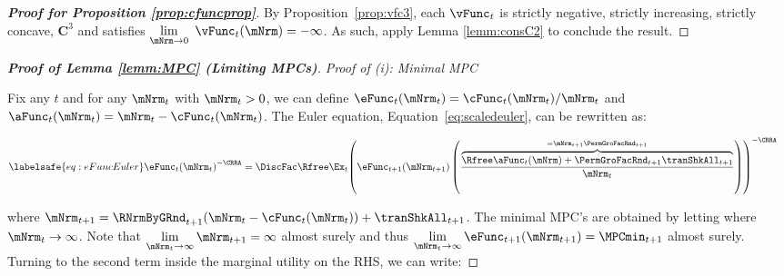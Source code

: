 \documentclass[\econtexRoot/BufferStockTheory]{subfiles}
\begin{document}
 
\hypertarget{cFunc-is-Twice-Continuously-Differentiable}{}
\begin{proof}[\textbf{\textit{Proof for Proposition \ref{prop:cfuncprop}}}]

By Proposition~\ref{prop:vfc3}, each $\vFunc_{t}$ is strictly negative, strictly increasing, strictly concave, $\mathbf{C}^{3}$ and satisfies $\lim\limits_{\mNrm\rightarrow 0}~\vFunc_{t}(\mNrm) =-\infty $.
As such, apply Lemma \ref{lemm:consC2} to conclude the result.


\end{proof}


\begin{comment}
\textcolor{blue}{Add remaining links to proof of existence of MPCs.
Check use of DMC.}
\end{comment}

\begin{proof}[\textbf{Proof of Lemma \ref{lemm:MPC} (Limiting MPCs)}]

\vspace{0.7em} %
\noindent\textit{Proof of (i): Minimal MPC}  %
\vspace{0.7em} %

Fix any $t$ and for any $\mNrm_{t}$ with  $\mNrm_{t}>0$, we can define $\eFunc_{t}(\mNrm_{t})=\cFunc_{t}(\mNrm_{t})/\mNrm_{t}$ and $\aFunc_{t}(\mNrm_{t})= \mNrm_{t} -\cFunc_{t}(\mNrm_{t})$.
The Euler equation, Equation~\eqref{eq:scaledeuler}, can be rewritten as:


\begin{equation}\begin{gathered}\begin{aligned}\labelsafe{eq:eFuncEuler}
 \eFunc_{t}{(\mNrm_{t})}^{-\CRRA}  & = \DiscFac \Rfree \Ex_{t}{\left(\eFunc_{t+1}({\mNrm}_{t+1})\left(\frac{\overbrace{\Rfree \aFunc_{t}(\mNrm)+{\PermGroFacRnd}_{t+1}{\tranShkAll}_{t+1}}^{={\mNrm}_{t+1} \PermGroFacRnd_{t+1}}}{\mNrm_{t}}\right)\right)}^{-\CRRA }
\end{aligned}\end{gathered}\end{equation}
%
%

where ${\mNrm}_{t+1} = \RNrmByGRnd_{t+1}(\mNrm_{t} -\cFunc_{t}(\mNrm_{t})) +\tranShkAll_{t+1}$.
The minimal MPC's are obtained by letting where $\mNrm_{t} \rightarrow \infty$.
Note that $\lim\limits_{\mNrm_{t}\rightarrow \infty} \mNrm_{t+1} = \infty$ almost surely and thus $\lim\limits_{\mNrm_{t}\rightarrow \infty}\eFunc_{t+1}({\mNrm}_{t+1}) = \MPCmin_{t+1}$ almost surely.
Turning to the second term inside the marginal utility on the RHS, we can write:


\end{proof}
\end{document}
